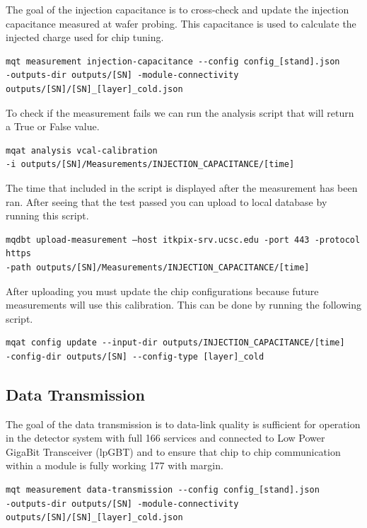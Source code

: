 \documentclass[12pt]{article}
\begin{document}
The goal of the injection capacitance is to cross-check and update the injection capacitance measured at wafer probing. This capacitance is used to calculate the injected charge used for chip tuning. 

\begin{verbatim}
mqt measurement injection-capacitance --config config_[stand].json 
-outputs-dir outputs/[SN] -module-connectivity outputs/[SN]/[SN]_[layer]_cold.json
\end{verbatim}

To check if the measurement fails we can run the analysis script that will return a True or False value. 
\begin{verbatim}
mqat analysis vcal-calibration 
-i outputs/[SN]/Measurements/INJECTION_CAPACITANCE/[time]
\end{verbatim}

The time that included in the script is displayed after the measurement has been ran. After seeing that the test passed you can upload to local database by running this script. 

\begin{verbatim}
mqdbt upload-measurement –host itkpix-srv.ucsc.edu -port 443 -protocol https
-path outputs/[SN]/Measurements/INJECTION_CAPACITANCE/[time]
\end{verbatim}
After uploading you must update the chip configurations because future measurements will use this calibration. This can be done by running the following script. 
\begin{verbatim}
mqat config update --input-dir outputs/INJECTION_CAPACITANCE/[time] 
-config-dir outputs/[SN] --config-type [layer]_cold
\end{verbatim}

\subsection{Data Transmission}

The goal of the data transmission is to data-link quality is sufficient for operation in the detector system with full
166 services and connected to Low Power GigaBit Transceiver (lpGBT) and to ensure that chip to chip communication within a module is fully working 177
with margin.

\begin{verbatim}
mqt measurement data-transmission --config config_[stand].json 
-outputs-dir outputs/[SN] -module-connectivity outputs/[SN]/[SN]_[layer]_cold.json
\end{verbatim}
\end{document}
